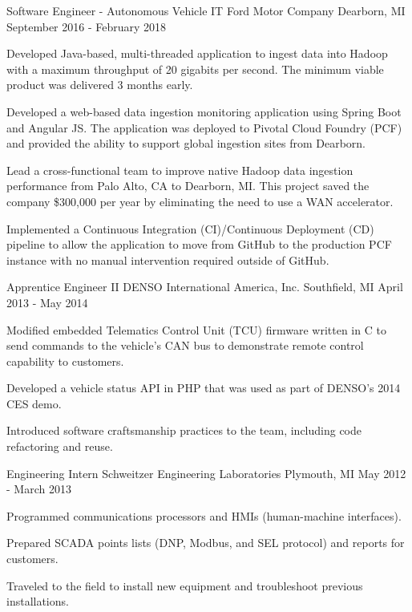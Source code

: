 \documentclass[11pt, a4paper]{awesome-cv}
\begin{document}
\begin{cventries}
    \cventry
    {Software Engineer - Autonomous Vehicle IT}
    {Ford Motor Company}
    {Dearborn, MI}
    {September 2016 - February 2018}
    {
        \begin{cvitems}
            \item{Developed Java-based, multi-threaded application to ingest data into Hadoop with a maximum throughput of 20 gigabits per second. The minimum viable product was delivered 
                  3 months early.}
            \item{Developed a web-based data ingestion monitoring application using Spring Boot and Angular JS. The application was deployed to Pivotal Cloud Foundry (PCF) and provided the 
                  ability to support global ingestion sites from Dearborn.}
            \item{Lead a cross-functional team to improve native Hadoop data ingestion performance from Palo Alto, CA to Dearborn, MI. This project saved the company \$300,000 per year by 
                  eliminating the need to use a WAN accelerator.}
            \item{Implemented a Continuous Integration (CI)/Continuous Deployment (CD) pipeline to allow the application to move from GitHub to the production PCF instance with no manual 
                  intervention required outside of GitHub.}
        \end{cvitems}
    }
    
    \cventry
    {Apprentice Engineer II}
    {DENSO International America, Inc.}
    {Southfield, MI}
    {April 2013 - May 2014}
    {
        \begin{cvitems}
            \item{Modified embedded Telematics Control Unit (TCU) firmware written in C to send commands to the vehicle's CAN bus to demonstrate remote control capability to customers.}
            \item{Developed a vehicle status API in PHP that was used as part of DENSO's 2014 CES demo.}
            \item{Introduced software craftsmanship practices to the team, including code refactoring and reuse.}
        \end{cvitems}
    }
    
    \cventry
    {Engineering Intern}
    {Schweitzer Engineering Laboratories}
    {Plymouth, MI}
    {May 2012 - March 2013}
    {
        \begin{cvitems}
            \item{Programmed communications processors and HMIs (human-machine interfaces).}
            \item{Prepared SCADA points lists (DNP, Modbus, and SEL protocol) and reports for customers.}
            \item{Traveled to the field to install new equipment and troubleshoot previous installations.}
        \end{cvitems}
    }
\end{cventries}
\end{document}

